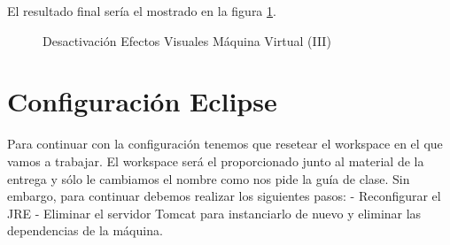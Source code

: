 \documentclass{scrartcl}
\begin{document}
El resultado final sería el mostrado en la figura \ref{fig:ConfVM06}.
\begin{figure}[H]
	
	\centering
	\caption{Desactivación Efectos Visuales Máquina Virtual (III)}
	\label{fig:ConfVM06}
	
\end{figure}

\section{Configuración Eclipse}
Para continuar con la configuración tenemos que resetear el workspace en el que vamos a trabajar. El workspace será el proporcionado junto al material de la entrega y sólo le cambiamos el nombre como nos pide la guía de clase. Sin embargo, para continuar debemos realizar los siguientes pasos:
- Reconfigurar el JRE
- Eliminar el servidor Tomcat para instanciarlo de nuevo y eliminar las dependencias de la máquina.
	
\end{document}
